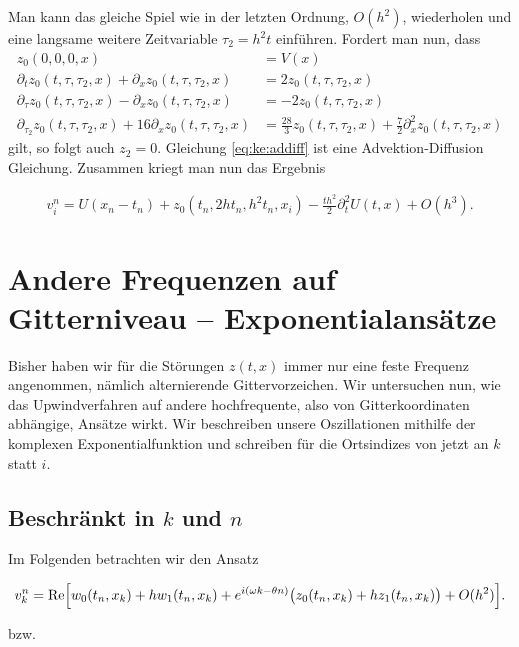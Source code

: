 Man kann das gleiche Spiel wie in der letzten Ordnung, $O(h^2)$, wiederholen und eine langsame weitere Zeitvariable $\tau_2 = h^2 t$ einführen.
Fordert man nun, dass 
\begin{align}
\nonumber
z_0(0,0,0,x) &= V(x)\\
\nonumber
\partial_t z_0(t,\tau, \tau_2, x) + \partial_x z_0(t,\tau,\tau_2,x) &= 2 z_0(t,\tau,\tau_2,x)\\
\nonumber
\partial_\tau z_0(t,\tau, \tau_2, x) - \partial_x z_0(t,\tau, \tau_2, x) &= -2z_0(t,\tau, \tau_2, x)\\
\label{eq:ke:addiff}
\partial_{\tau_2} z_0(t,\tau, \tau_2, x) + 16 \partial_x z_0(t,\tau, \tau_2, x) &= \frac{28}{3} z_0(t,\tau, \tau_2, x) + \frac{7}{2} \partial^2_x z_0(t,\tau, \tau_2, x)
\end{align}
gilt, so folgt auch $z_2 = 0$. Gleichung \eqref{eq:ke:addiff} ist eine Advektion-Diffusion Gleichung.
Zusammen kriegt man nun das Ergebnis

\begin{align*}
v^n_i = U(x_n-t_n) + z_0(t_n, 2 h t_n, h^2 t_n, x_i) -\frac{th^2}{2} \partial^2_t U(t,x) + O(h^3).
\end{align*}

\section{Andere Frequenzen auf Gitterniveau -- Exponentialansätze}

Bisher haben wir für die Störungen $z(t,x)$ immer nur eine feste Frequenz angenommen, nämlich alternierende Gittervorzeichen.
Wir untersuchen nun, wie das Upwindverfahren auf andere hochfrequente, also von Gitterkoordinaten abhängige, Ansätze wirkt.
Wir beschreiben unsere Oszillationen mithilfe der komplexen Exponentialfunktion und schreiben für die Ortsindizes von jetzt an $k$ statt $i$.

\subsection*{Beschränkt in $k$ und $n$}

Im Folgenden betrachten wir den Ansatz

\begin{align}\label{eq:exp:ansatz}
v^n_k = \operatorname{Re} \Bigl[ w_0(t_n, x_k) + h w_1(t_n, x_k) + e^{i(\omega k - \theta n)} \bigl( z_0(t_n, x_k) + h z_1(t_n, x_k) \bigr) + O(h^2) \Bigr].
\end{align}

bzw.

